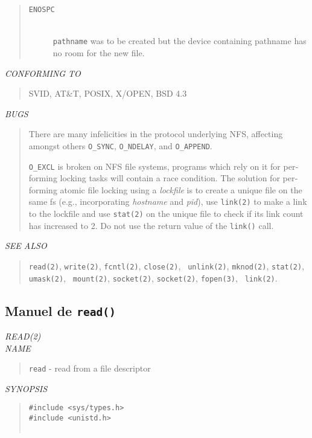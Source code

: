 \begin{appendix}
\begin{english}
\begin{quote}
\begin{description}
	\item[{\tt ENOSPC}]\mbox{}\\
		{\tt pathname} was to be created but the device containing pathname
		has no room for the new file.
\end{description}
\end{quote}

{\sl CONFORMING TO}
\begin{quote}
	SVID, AT\&T, POSIX, X/OPEN, BSD 4.3
\end{quote}

{\sl BUGS}
\begin{quote}
	There are many infelicities in the protocol underlying NFS, 
	affecting amongst others {\tt O\_SYNC}, {\tt O\_NDELAY}, and
	{\tt O\_APPEND}.

	{\tt O\_EXCL} is broken on NFS file systems, programs which rely on
	 it for performing locking tasks will contain a race condition. 
	The solution for performing atomic file locking using a {\sl lockfile}
	is to create a unique file on the same fs (e.g., incorporating 
	{\sl hostname} and {\sl pid}), use {\tt link(2)} to make a link to the
	lockfile and use {\tt stat(2)} on the unique file to check if its
	link count has increased to 2. Do not use the return value of the
	{\tt link()} call.
\end{quote}

{\sl SEE ALSO}
\begin{quote}
	{\tt read(2)}, {\tt write(2)}, {\tt fcntl(2)}, {\tt close(2)}, {\tt
	unlink(2)}, {\tt mknod(2)}, {\tt stat(2)}, {\tt umask(2)}, {\tt
	mount(2)}, {\tt socket(2)}, {\tt socket(2)}, {\tt fopen(3)}, {\tt
	link(2)}.
\end{quote}
\end{english}

\subsection{Manuel de {\tt read()}}
\begin{english}
{\sl READ(2)}\\

{\sl NAME}
\begin{quote}
	{\tt read} - read from a file descriptor
\end{quote}

{\sl SYNOPSIS}
\begin{quote}
\begin{verbatim}
#include <sys/types.h>
#include <unistd.h>


\end{verbatim}
\end{quote}
\end{english}
\end{appendix}
